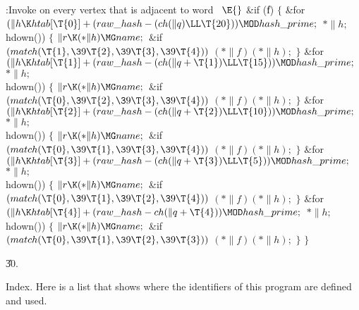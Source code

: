 \B{}:Invoke  on every vertex that is adjacent to word~%
\X${}\E{}$\6
\&{if} (\|f)\5
${}\{{}$\1\6
\&{for} ${}(\|h\K\\{htab}[\T{0}]+(\\{raw\_hash}-(\\{ch}(\|q)\LL\T{20}))\MOD%
\\{hash\_prime};{}$ ${}{*}\|h;{}$ \\{hdown}())\5
${}\{{}$\1\6
${}\|r\K({*}\|h)\MG\\{name};{}$\6
\&{if} ${}(\\{match}(\T{1},\39\T{2},\39\T{3},\39\T{4})){}$\1\5
${}({*}\|f)({*}\|h);{}$\2\6
\4${}\}{}$\2\6
\&{for} ${}(\|h\K\\{htab}[\T{1}]+(\\{raw\_hash}-(\\{ch}(\|q+\T{1})\LL\T{15}))%
\MOD\\{hash\_prime};{}$ ${}{*}\|h;{}$ \\{hdown}())\5
${}\{{}$\1\6
${}\|r\K({*}\|h)\MG\\{name};{}$\6
\&{if} ${}(\\{match}(\T{0},\39\T{2},\39\T{3},\39\T{4})){}$\1\5
${}({*}\|f)({*}\|h);{}$\2\6
\4${}\}{}$\2\6
\&{for} ${}(\|h\K\\{htab}[\T{2}]+(\\{raw\_hash}-(\\{ch}(\|q+\T{2})\LL\T{10}))%
\MOD\\{hash\_prime};{}$ ${}{*}\|h;{}$ \\{hdown}())\5
${}\{{}$\1\6
${}\|r\K({*}\|h)\MG\\{name};{}$\6
\&{if} ${}(\\{match}(\T{0},\39\T{1},\39\T{3},\39\T{4})){}$\1\5
${}({*}\|f)({*}\|h);{}$\2\6
\4${}\}{}$\2\6
\&{for} ${}(\|h\K\\{htab}[\T{3}]+(\\{raw\_hash}-(\\{ch}(\|q+\T{3})\LL\T{5}))%
\MOD\\{hash\_prime};{}$ ${}{*}\|h;{}$ \\{hdown}())\5
${}\{{}$\1\6
${}\|r\K({*}\|h)\MG\\{name};{}$\6
\&{if} ${}(\\{match}(\T{0},\39\T{1},\39\T{2},\39\T{4})){}$\1\5
${}({*}\|f)({*}\|h);{}$\2\6
\4${}\}{}$\2\6
\&{for} ${}(\|h\K\\{htab}[\T{4}]+(\\{raw\_hash}-\\{ch}(\|q+\T{4}))\MOD\\{hash%
\_prime};{}$ ${}{*}\|h;{}$ \\{hdown}())\5
${}\{{}$\1\6
${}\|r\K({*}\|h)\MG\\{name};{}$\6
\&{if} ${}(\\{match}(\T{0},\39\T{1},\39\T{2},\39\T{3})){}$\1\5
${}({*}\|f)({*}\|h);{}$\2\6
\4${}\}{}$\2\6
\4${}\}{}$\2\par
\U30.\fi

Index. Here is a list that shows where the identifiers of this program
are
defined and used.
\fi

\inx
\fin
\con
